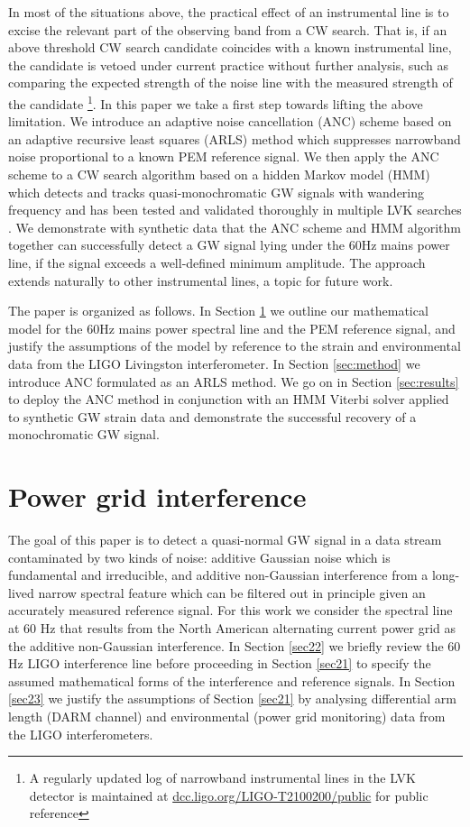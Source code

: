 \documentclass[pra,superscriptaddress,reprint,amsmath,amssymb,nofootinbib]{revtex4-2}
\begin{document}
In most  of the situations above, the practical effect of an instrumental line is to excise the relevant part of the observing band from a CW search. That is, if an above threshold CW search candidate coincides with a known instrumental line, the candidate is vetoed under current practice without further analysis, such as comparing the expected strength of the noise line with the measured strength of the candidate \footnote{A regularly updated log of narrowband instrumental lines in the LVK detector is maintained at \href{https://dcc.ligo.org/LIGO-T2100200/public}{dcc.ligo.org/LIGO-T2100200/public} for public reference}. In this paper we take a first step towards lifting the above limitation. We introduce an adaptive noise cancellation (ANC) scheme  based on an adaptive recursive least squares (ARLS) method which suppresses narrowband noise proportional to a known PEM reference signal. We then apply the ANC scheme to a CW search algorithm based on a hidden Markov model (HMM) which detects and tracks quasi-monochromatic GW signals with wandering frequency and has been tested and validated thoroughly in multiple LVK searches \cite{Suvorova2016PhRv,Piccinni2022,Riles2023,Wette2023}. We demonstrate with synthetic data that the ANC scheme and HMM algorithm together can successfully detect a GW signal lying under the 60Hz mains power line, if the signal exceeds a well-defined minimum amplitude. The approach extends naturally to other instrumental lines, a topic for future work. \newline 

The paper is organized as follows. In Section \ref{sec:pgi} we outline our mathematical model for the 60Hz mains power spectral line and the PEM reference signal, and justify the assumptions of the model by reference to the strain and environmental data from the LIGO Livingston interferometer.  In Section \ref{sec:method} we introduce ANC formulated as an ARLS method. We go on in Section \ref{sec:results} to deploy the ANC method in conjunction with an HMM Viterbi solver applied to synthetic GW strain data and demonstrate the successful recovery of a monochromatic GW signal.  


\section{Power grid interference} \label{sec:pgi}
The goal of this paper is to detect a quasi-normal GW signal in a data stream contaminated by two kinds of noise: additive Gaussian noise which is fundamental and irreducible, and additive non-Gaussian interference from a long-lived narrow spectral feature which can be filtered out in principle given an accurately measured reference signal. For this work we consider the spectral line at 60 Hz that results from the North American alternating current power grid as the additive non-Gaussian interference. In Section \ref{sec22} we briefly review the 60 Hz LIGO interference line before proceeding in Section \ref{sec21} to specify the assumed mathematical forms of the interference and reference signals. In Section \ref{sec23} we justify the assumptions of Section \ref{sec21} by analysing differential arm length (DARM channel) and environmental (power grid monitoring) data from the LIGO interferometers. 
\end{document}
